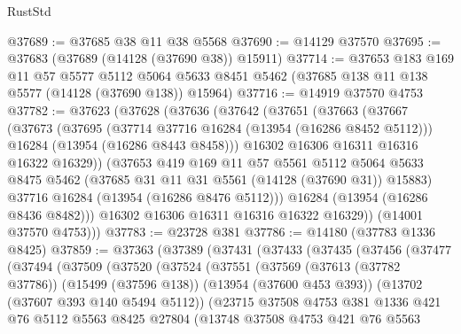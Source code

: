 \begin{lexlean}{RustStd}
\begin{coremodule}
@37689 := @37685 @38 @11 @38 @5568
@37690 := @14129 @37570
@37695 := @37683 (@37689 (@14128 (@37690 @38)) @15911)
@37714 := @37653
    @183
    @169
    @11
    @57
    @5577
    @5112
    @5064
    @5633
    @8451
    @5462
    (@37685 @138 @11 @138 @5577 (@14128 (@37690 @138)) @15964)
@37716 := @14919 @37570 @4753
@37782 := @37623
    (@37628
      (@37636
        (@37642
          (@37651
            (@37663
              (@37667
                (@37673
                  (@37695
                    (@37714 @37716 @16284 (@13954 (@16286 @8452 @5112)))
                    @16284
                    (@13954 (@16286 @8443 @8458)))
                  @16302
                  @16306
                  @16311
                  @16316
                  @16322
                  @16329))
              (@37653
                @419
                @169
                @11
                @57
                @5561
                @5112
                @5064
                @5633
                @8475
                @5462
                (@37685 @31 @11 @31 @5561 (@14128 (@37690 @31)) @15883)
                @37716
                @16284
                (@13954 (@16286 @8476 @5112)))
              @16284
              (@13954 (@16286 @8436 @8482)))
            @16302
            @16306
            @16311
            @16316
            @16322
            @16329))
        (@14001 @37570 @4753)))
@37783 := @23728 @381
@37786 := @14180 (@37783 @1336 @8425)
@37859 := @37363
    (@37389
      (@37431
        (@37433
          (@37435
            (@37456
              (@37477
                (@37494
                  (@37509
                    (@37520
                      (@37524
                        (@37551
                          (@37569
                            (@37613 (@37782 @37786))
                            (@15499 (@37596 @138))
                            (@13954 (@37600 @453 @393))
                            (@13702 (@37607 @393 @140 @5494 @5112))
                            (@23715
                              @37508
                              @4753
                              @381
                              @1336
                              @421
                              @76
                              @5112
                              @5563
                              @8425
                              @27804
                              (@13748
                                @37508
                                @4753
                                @421
                                @76
                                @5563

\end{coremodule}
\end{lexlean}
